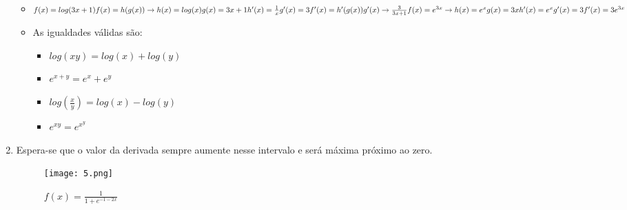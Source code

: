 \documentclass[11pt,a4paper]{book}
\begin{document}
\begin{enumerate}
\begin{itemize}
			\item $f(x)=log(3x+1)\\
			f(x)=h(g(x)) \rightarrow h(x)=log(x) g(x)=3x+1\\
			h'(x)=\frac{1}{x}\\
			g'(x)=3\\
			\\
			f'(x)=h'(g(x))g'(x) \rightarrow \frac{3}{3x+1}\\
			\\
			\\
			f(x)=e^{3x} \rightarrow h(x)=e^{x} g(x)=3x\\
			h'(x)=e^{x}\\
			g'(x)=3\\
			\\
			f'(x)=3e^{3x} $
			\item As igualdades válidas são:
			\begin{itemize}
				\item $log(xy)=log(x) + log(y)$
				\item $e^{x+y}=e^{x}+e^{y}$
				\item $log(\frac{x}{y})=log(x)-log(y)$
				\item $e^{xy}=e^{x^{y}}$
			\end{itemize}
		\end{itemize}
		\newpage
		\item Espera-se que o valor da derivada sempre aumente nesse intervalo e será máxima próximo ao zero.
		\begin{figure}[t]
			\centering
			\texttt{[image: 5.png]}
			\caption{$f(x)=\frac{1}{1+e^{-1-2x}}$}
		\end{figure}
	\end{enumerate}
\end{document}
